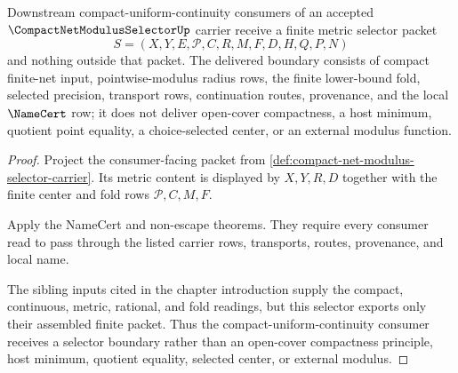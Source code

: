 \begin{theorem}
\label{thm:compact-net-modulus-selector-metric-consumer-boundary}
Downstream compact-uniform-continuity consumers of an accepted $\CompactNetModulusSelectorUp$ carrier receive a finite metric selector packet
$$
S=(X,Y,E,\mathcal{P},C,R,M,F,D,H,Q,P,N)
$$
and nothing outside that packet. The delivered boundary consists of compact finite-net input, pointwise-modulus radius rows, the finite lower-bound fold, selected precision, transport rows, continuation routes, provenance, and the local $\NameCert$ row; it does not deliver open-cover compactness, a host minimum, quotient point equality, a choice-selected center, or an external modulus function.
\end{theorem}
\begin{proof}
Project the consumer-facing packet from \autoref{def:compact-net-modulus-selector-carrier}. Its metric content is displayed by $X,Y,R,D$ together with the finite center and fold rows $\mathcal{P},C,M,F$.

Apply the NameCert and non-escape theorems. They require every consumer read to pass through the listed carrier rows, transports, routes, provenance, and local name.

The sibling inputs cited in the chapter introduction supply the compact, continuous, metric, rational, and fold readings, but this selector exports only their assembled finite packet. Thus the compact-uniform-continuity consumer receives a selector boundary rather than an open-cover compactness principle, host minimum, quotient equality, selected center, or external modulus.
\end{proof}

